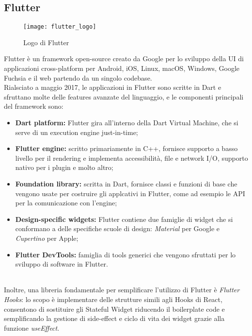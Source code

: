 \subsection{Flutter}
\begin{figure}[ht]
    \centering
    \texttt{[image: flutter\_logo]}
    \caption{Logo di Flutter}
\end{figure} \aCapo{}
Flutter è un framework open-source creato da Google per lo sviluppo della UI di applicazioni cross-platform per Android, iOS, Linux, macOS, Windows, Google Fuchsia e il web partendo da un singolo codebase.\\
Rialsciato a maggio 2017, le applicazioni in Flutter sono scritte in Dart e sfruttano molte delle features avanzate del linguaggio, e le componenti principali del framework sono:
\begin{itemize}
    \item \textbf{Dart platform:} Flutter gira all'interno della Dart Virtual Machine, che si serve di un execution engine just-in-time;
    \item \textbf{Flutter engine:} scritto primariamente in C++, fornisce supporto a basso livello per il rendering e implementa accessibilità, file e network I/O, supporto nativo per i plugin e molto altro;
    \item \textbf{Foundation library:} scritta in Dart, fornisce classi e funzioni di base che vengono usate per costruire gli applcativi in Flutter, come ad esempio le API per la comunicazione con l'engine;
    \item \textbf{Design-specific widgets:} Flutter contiene due famiglie di widget che si conformano a delle specifiche scuole di design: \textit{Material} per Google e \textit{Cupertino} per Apple;
    \item \textbf{Flutter DevTools:} famiglia di tools generici che vengono sfruttati per lo sviluppo di software in Flutter.
\end{itemize}
~\\
Inoltre, una libreria fondamentale per semplificare l'utilizzo di Flutter è \textit{Flutter Hooks}: lo scopo è implementare delle strutture simili agli Hooks di React, consentono di sostituire gli Stateful Widget riducendo il boilerplate code e semplificando la gestione di side-effect e ciclo di vita dei widget grazie alla funzione \textit{useEffect}.

